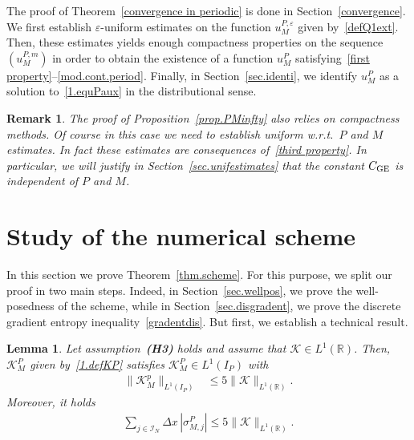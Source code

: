 \documentclass[11pt]{amsart}
\newtheorem{lemma}{Lemma}
\newtheorem{remark}{Remark}
\newcommand{\K}{\mathcal{K}}
\newcommand{\R}{\mathbb{R}}
\newcommand{\I}{\mathcal{I}_N}
\newcommand{\eps}{\varepsilon}
\begin{document}
The proof of Theorem~\ref{convergence in periodic} is done in Section~\ref{convergence}. We first establish  $\eps$-uniform estimates on the function $u^{P,\eps}_M$ given by~\eqref{defQ1ext}. Then, these estimates yields enough compactness properties on the sequence $(u^{P,m}_M)$ in order to obtain the existence of a function $u^P_M$ satisfying~\eqref{first property}--\eqref{mod.cont.period}. Finally, in Section~\ref{sec.identi}, we identify $u^P_M$ as a solution to~\eqref{1.equPaux} in the distributional sense.

\begin{remark}\label{rem.constansMP}
The proof of Proposition~\ref{prop.PMinfty} also relies on compactness methods. Of course in this case we need to establish uniform w.r.t.~$P$ and $M$ estimates. In fact these estimates are consequences of~\eqref{third property}. In particular, we will justify in Section~\ref{sec.unifestimates} that the constant $C_{\rm GE}$ is independent of $P$ and $M$.
\end{remark}

   
\section{Study of the numerical scheme}\label{sec.studyscheme}

In this section we prove Theorem~\ref{thm.scheme}. For this purpose, we split our proof in two main steps. Indeed, in Section~\ref{sec.wellpos}, we prove the well-posedness of the scheme, while in Section~\ref{sec.disgradent}, we prove the discrete gradient entropy inequality~\eqref{gradentdis}. But first, we establish a technical result.

\begin{lemma}\label{kpdelta less than k}
Let assumption~\textbf{\emph{(H3)}} holds and assume that $\K \in L^1(\R)$. Then, $\K^P_M$ given by~\eqref{1.defKP} satisfies $\K^P_M \in L^1(I_P)$ with
\begin{align}\label{normKPM}
    \|\mathcal{K}^p_M\|_{L^1(I_P)} &\leq 5 \|\mathcal{K}\|_{L^1(\mathbb{R})}.
\end{align}
Moreover, it holds
  \begin{align}\label{Normcesaro}
     \sum_{j \in \I} \Delta x \, \left|\sigma_{M,j}^P\right| \leq 5 \|\mathcal{K}\|_{L^1(\mathbb{R})}.
    \end{align}
\end{lemma}
\end{document}
